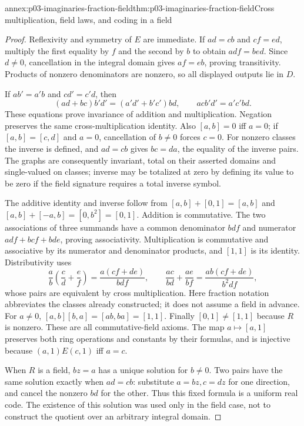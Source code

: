 \begin{annexitem}{annex:p03-imaginaries-fraction-field}{thm:p03-imaginaries-fraction-field}{Cross multiplication, field laws, and coding in a field}
\begin{proof}
Reflexivity and symmetry of \(E\) are immediate. If \(ad=cb\)
and \(cf=ed\), multiply the first equality by \(f\) and the second
by \(b\) to obtain \(adf=bed\). Since \(d\ne0\), cancellation
in the integral domain gives \(af=eb\), proving transitivity.
Products of nonzero denominators are nonzero, so all displayed outputs lie
in \(D\).

If \(ab'=a'b\) and \(cd'=c'd\), then
\[
 (ad+bc)b'd'=(a'd'+b'c')bd,\qquad
                       acb'd'=a'c'bd.
\]
These equations prove invariance of addition and multiplication. Negation
preserves the same cross-multiplication identity. Also \([a,b]=0\)
iff \(a=0\); if \([a,b]=[c,d]\) and \(a=0\), cancellation of
\(b\ne0\) forces \(c=0\). For nonzero classes the inverse is defined,
and \(ad=cb\) gives \(bc=da\), the equality of the inverse pairs.
The graphs are consequently invariant, total on their asserted domains and
single-valued on classes; inverse may be totalized at zero by defining its
value to be zero if the field signature requires a total inverse symbol.

The additive identity and inverse follow from
\([a,b]+[0,1]=[a,b]\) and
\([a,b]+[-a,b]=[0,b^2]=[0,1]\).
Addition is commutative. The two associations of three summands have a common
denominator \(bdf\) and numerator \(adf+bcf+bde\), proving
associativity. Multiplication is commutative and associative by its numerator
and denominator products, and \([1,1]\) is its identity. Distributivity
uses
\[
 \frac a b\left(\frac c d+\frac e f\right)
       =\frac{a(cf+de)}{bdf},\qquad
 \frac{ac}{bd}+\frac{ae}{bf}
       =\frac{ab(cf+de)}{b^2df},
\]
whose pairs are equivalent by cross multiplication. Here fraction notation
abbreviates the classes already constructed; it does not assume a field in
advance. For \(a\ne0\), \([a,b][b,a]=[ab,ba]=[1,1]\).
Finally \([0,1]\ne[1,1]\) because \(R\) is nonzero. These are all
commutative-field axioms. The map \(a\mapsto[a,1]\) preserves both
ring operations and constants by their formulas, and is injective because
\((a,1)E(c,1)\) iff \(a=c\).

When \(R\) is a field, \(bz=a\) has a unique solution for \(b\ne0\).
Two pairs have the same solution exactly when \(ad=cb\): substitute
\(a=bz,c=dz\) for one direction, and cancel the nonzero \(bd\)
for the other. Thus this fixed formula is a uniform real code. The existence
of this solution was used only in the field case, not to construct the
quotient over an arbitrary integral domain.
\end{proof}
\end{annexitem}
